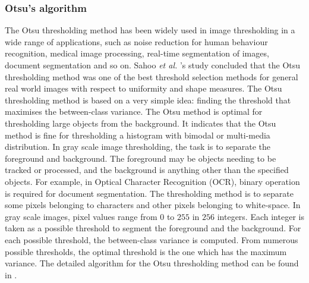 \subsubsection{Otsu's algorithm}
The Otsu thresholding method \cite{Otsu1979} has been widely used in image thresholding in a wide range of applications, such as noise reduction for human behaviour recognition, medical image processing, real-time segmentation of images, document segmentation and so on. Sahoo \textit{et al.} \cite{Sahoo1988}'s study concluded that the Otsu thresholding method was one of the best threshold selection methods for general real world images with respect to uniformity and shape measures. The Otsu thresholding method is based on a very simple idea: finding the threshold that maximises the between-class variance. The Otsu method is optimal for thresholding large objects from the background. It indicates that the Otsu method is fine for thresholding a histogram with bimodal or multi-media distribution. In gray scale image thresholding, the task is to separate the foreground and background. The foreground may be objects needing to be tracked or processed, and the background is anything other than the specified objects. For example, in Optical Character Recognition (OCR), binary operation is required for document segmentation. The thresholding method is to separate some pixels belonging to characters and other pixels belonging to white-space. In gray scale images, pixel values range from $0$ to $255$ in $256$ integers. Each integer is taken as a possible threshold to segment the foreground and the background. For each possible threshold, the between-class variance is computed. From numerous possible thresholds, the optimal threshold is the one which has the maximum variance. The detailed algorithm for the Otsu thresholding method can be found in \cite{Liao2001}.

